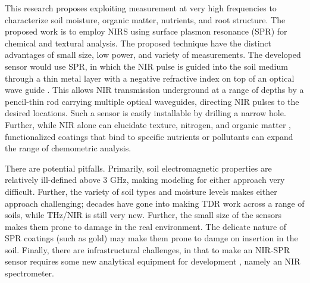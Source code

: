 \documentclass[11pt,letterpaper]{article}
\begin{document}
This research proposes exploiting measurement at very high frequencies to characterize soil moisture, organic matter, nutrients, and root structure. The proposed work is to employ NIRS using surface plasmon resonance (SPR) for chemical and textural analysis. The proposed technique have the distinct advantages of small size, low power, and variety of measurements. The developed sensor would use SPR, in which the NIR pulse is guided into the soil medium through a thin metal layer with a negative refractive index on top of an optical wave guide \cite{shibayama2016surface}. This allows NIR transmission underground at a range of depths by a pencil-thin rod carrying multiple optical waveguides, directing NIR pulses to the desired locations. Such a sensor is easily installable by drilling a narrow hole. Further, while NIR alone can elucidate texture, nitrogen, and organic matter \cite{chang2001near, sorensen2005determination}, functionalized coatings that bind to specific nutrients or pollutants can expand the range of chemometric analysis. %

There are potential pitfalls. Primarily, soil electromagnetic properties are relatively ill-defined above 3 GHz, making modeling for either approach very difficult. Further, the variety of soil types and moisture levels makes either approach challenging; decades have gone into making TDR work across a range of soils, while THz/NIR is still very new. Further, the small size of the sensors makes them prone to damage in the real environment. The delicate nature of SPR coatings (such as gold) may make them prone to damge on insertion in the soil. Finally, there are infrastructural challenges, in that to make an NIR-SPR sensor requires some new analytical equipment for development \cite{ikehata2004surface}, namely an NIR spectrometer.
\end{document}
